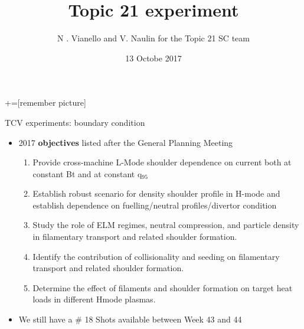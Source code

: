 \documentclass[10pt, compress]{beamer}
\title{Topic 21 experiment}
\date{13 Octobe 2017}
\author[Topic 21 ST]{N . Vianello and V. Naulin for the
  Topic 21 SC team}
\newcommand\Fontvi{\fontsize{8}{7.2}\selectfont}
\begin{document}
+=[remember picture]
\maketitle
\begin{frame}{TCV experiments: boundary condition}
\vspace{-1cm}
\Fontvi
\begin{itemize}
\item 2017 \textbf{objectives} listed after the General Planning Meeting
  \begin{enumerate}
  \item Provide cross-machine \alert{L-Mode} shoulder dependence on
    current both at constant Bt and at constant q$_{95}$
  \item Establish robust scenario for density shoulder profile in
        H-mode and establish dependence on fuelling/neutral
        profiles/divertor condition
  \item Study the role of ELM regimes, neutral compression, and
    particle density in filamentary transport and related shoulder
    formation.
  \item Identify the contribution of collisionality and
    seeding on filamentary transport and related shoulder
    formation.
  \item Determine the effect of filaments and shoulder
    formation on target heat loads in different Hmode plasmas.
  \end{enumerate}
\item We still have a \# 18 Shots available between Week 43 and 44
\end{itemize}
\end{frame}
\end{document}
